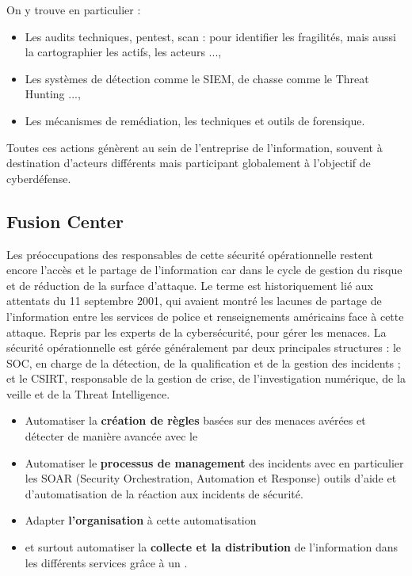 On y trouve en particulier : 

\begin{itemize}
  \item Les audits techniques, pentest, scan : pour identifier les fragilités, mais aussi la cartographier les actifs, les acteurs ...,
  \item Les systèmes de détection comme le SIEM, de chasse comme le Threat Hunting ...,
  \item Les mécanismes de remédiation, les techniques et outils de forensique.
\end{itemize}

Toutes ces actions génèrent au sein de l'entreprise de l'information, souvent à destination d'acteurs différents mais participant globalement à l'objectif de cyberdéfense.

\subsection{Fusion Center}

Les préoccupations des responsables de cette sécurité opérationnelle restent encore l'accès et le partage de l'information car dans le cycle de gestion du risque et de réduction de la surface d'attaque. Le terme  est historiquement lié aux attentats du 11 septembre 2001, qui avaient montré les lacunes de partage de l'information entre les services de police et renseignements américains face à cette attaque. Repris par les experts de la cybersécurité, pour gérer les menaces. 
La sécurité opérationnelle est gérée généralement par deux principales structures : le SOC, en charge de la détection, de la qualification et de la gestion des incidents ; et le CSIRT, responsable de la gestion de crise, de l’investigation numérique, de la veille et de la Threat Intelligence.



\begin{itemize}
  \item Automatiser la \textbf{création de règles} basées sur des menaces avérées  et détecter de manière avancée avec le 
  \item Automatiser le \textbf{processus de management }des incidents avec en  particulier les SOAR (Security Orchestration, Automation et Response) outils d’aide et d’automatisation de la réaction aux incidents de sécurité.
  \item Adapter \textbf{l’organisation} à cette automatisation
  \item et surtout automatiser la \textbf{collecte et la distribution} de l'information dans les différents services grâce à un .
\end{itemize}


